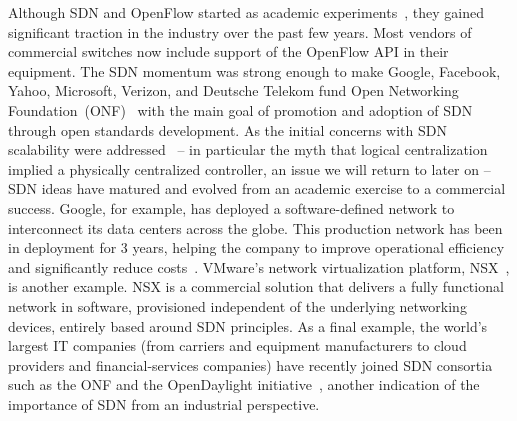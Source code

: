 Although SDN and OpenFlow started as academic
experiments~\cite{mckeown2008}, they gained significant traction in the
industry over the past few years.  Most vendors of commercial switches
now include support of the OpenFlow API in their equipment. The SDN momentum 
was strong enough to make Google, Facebook, Yahoo, Microsoft, Verizon, and Deutsche Telekom fund Open Networking Foundation~(ONF)~\cite{onf2013-3} with the main
goal of promotion and adoption of SDN through open standards development. %
  As the initial concerns with SDN scalability were addressed~\cite{yeganeh2013}
-- in particular the myth that logical centralization implied a
physically centralized controller, an issue we will return to later on
-- SDN ideas have matured and evolved from an academic exercise to
a commercial success. Google, for example, has deployed a software-defined
network to interconnect its data centers across the globe. This production 
network has been in deployment for 3 years, helping the company to improve 
operational efficiency and significantly reduce costs~\cite{jain2013-1}.
VMware's network virtualization platform, NSX~\cite{vmware2013},
is another example.  NSX is a commercial solution that delivers a
fully functional network in software, provisioned independent of the
underlying networking devices, entirely based around SDN principles.  As
a final example, the world's largest IT companies (from carriers and
equipment manufacturers to cloud providers and financial-services
companies) have recently joined SDN consortia such as the ONF  and the OpenDaylight initiative~\cite{opendaylight2013}, 
another indication of the importance of SDN from an industrial perspective.



